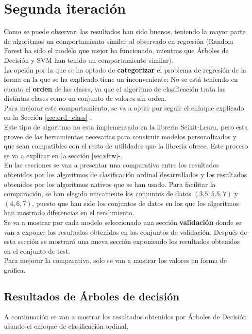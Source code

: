 \section{Segunda iteración}
\label{sec:ord}
Como se puede observar, las resultados han sido buenos, teniendo la mayor parte de algoritmos un comportamiento similar al observado en regresión (Random Forest ha sido el modelo que mejor ha funcionado, mientras que Árboles de Decisión y SVM han tenido un comportamiento similar).\\
La opción por la que se ha optado de \textbf{categorizar} el problema de regresión de la forma en la que se ha explicado tiene un inconveniente: No se está teniendo en cuenta el \textbf{orden} de las clases, ya que el algoritmo de clasificación trata las distintas clases como un conjunto de valores sin orden.\\
\linebreak
Para mejorar este comportamiento, se va a optar por seguir el enfoque explicado en la Sección \ref{sec:ord_class}-.\\
Este tipo de algoritmo no esta implementado en la librería Scikit-Learn, pero esta provee de las herramientas necesarias para construir modelos personalizados y que sean compatibles con el resto de utilidades que la librería ofrece. Este proceso se va a explicar en la sección \ref{sec:sftw}-.\\
\linebreak
En las secciones se van a presentar una comparativa entre los resultados obtenidos por los algoritmos de clasificación ordinal desarrollados y los resultados obtenidos por los algoritmos nativos que se han usado. Para facilitar la comparación, se han elegido unicamente los conjuntos de datos $(3.5,5.5,7)$  y $(4,6,7)$, puesto que han sido los conjuntos de datos en los que los algoritmos han mostrado diferencias en el rendimiento.\\
Se va a mostrar por cada modelo seleccionado una sección \textbf{validación} donde se van a exponer los resultados obtenidos en los conjuntos de validación. Después de esta sección se mostrará una nueva sección exponiendo los resultados obtenidos en el conjunto de test.\\
\linebreak
Para mejorar la comparativa, solo se van a mostrar los valores en forma de gráfica.
\clearpage
\subsection{Resultados de Árboles de decisión}
\label{sec:ord_cmp_dt}
A continuación se van a mostrar los resultados obtenidos por Árboles de Decisión usando el enfoque de clasificación ordinal.
